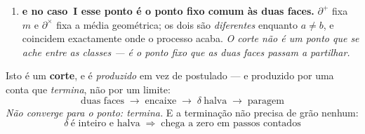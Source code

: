\documentclass[livro.tex]{subfiles}
\begin{document}
\begin{teorema}[o corte]
\begin{enumerate}
{é a órbita inteira, escrita de uma vez}, e é por isso que a volta é exacta;\item[(5)] \textbf{e no caso~I esse ponto é o ponto fixo comum às duas faces.}
$\partial^{+}$ fixa $m$ e $\partial^{\times}$ fixa a média geométrica; os dois são
\emph{diferentes} enquanto $a\neq b$, e coincidem exactamente onde o processo
acaba. \emph{O corte não é um ponto que se ache entre as classes --- é o ponto
fixo que as duas faces passam a partilhar.}\end{enumerate}
Isto é um \textbf{corte}, e é \emph{produzido} em vez de postulado --- e
produzido por uma conta que \emph{termina}, não por um limite:
\[
\boxed{\;\text{duas faces}\;\to\;\text{encaixe}\;\to\;\delta\ \text{halva}\;\to\;
\text{paragem}\;}
\]
\emph{Não converge para o ponto: termina.} E a terminação não precisa de grão
nenhum:
\[
\boxed{\;\delta\ \text{é inteiro e halva}\;\Longrightarrow\;\text{chega a zero em
passos contados}\;}
\]
\end{teorema}
\end{document}
